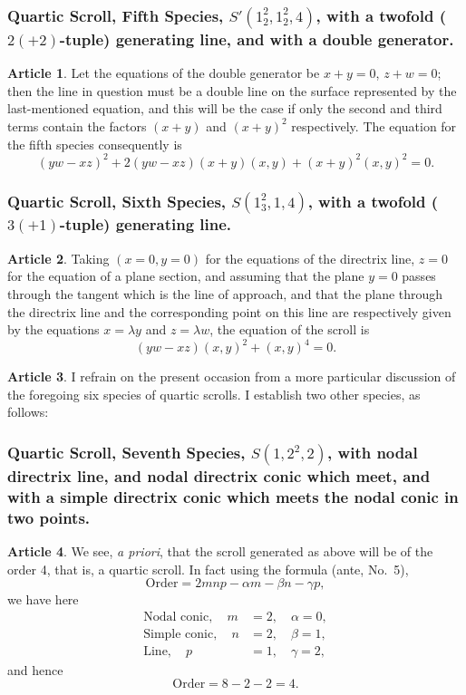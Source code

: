 \documentclass[12pt,a4paper]{article}
\theoremstyle{definition}
\newtheorem{art}{Article}[section]
\begin{document}
\subsubsection*{Quartic Scroll, Fifth Species, $S'(1_2^2, 1_2^2, 4)$, with a twofold ($2 (+ 2)$-tuple) generating line, and with a double generator.}

\begin{art}
Let the equations of the double generator be $x + y = 0$, $z + w = 0$; then the line in question must be a double line on the surface represented by the last-mentioned equation, and this will be the case if only the second and third terms contain the factors $(x + y)$ and $(x + y)^2$ respectively. The equation for the fifth species consequently is
\[
(yw - xz)^2 + 2(yw - xz)(x + y)(x, y) + (x + y)^2 (x, y)^2 = 0.
\]
\end{art}

\subsubsection*{Quartic Scroll, Sixth Species, $S(1_3^2, 1, 4)$, with a twofold ($3 (+ 1)$-tuple) generating line.}

\begin{art}
Taking $(x = 0, y = 0)$ for the equations of the directrix line, $z = 0$ for the equation of a plane section, and assuming that the plane $y = 0$ passes through the tangent which is the line of approach, and that the plane through the directrix line and the corresponding point on this line are respectively given by the equations $x = \lambda y$ and $z = \lambda w$, the equation of the scroll is
\[
(yw - xz)(x, y)^2 + (x, y)^4 = 0.
\]
\end{art}

\begin{art}
I refrain on the present occasion from a more particular discussion of the foregoing six species of quartic scrolls. I establish two other species, as follows:
\end{art}

\subsubsection*{Quartic Scroll, Seventh Species, $S(1, 2^2, 2)$, with nodal directrix line, and nodal directrix conic which meet, and with a simple directrix conic which meets the nodal conic in two points.}

\begin{art}
We see, \textit{a priori}, that the scroll generated as above will be of the order 4, that is, a quartic scroll. In fact using the formula (ante, No.~5),
\[
\text{Order} = 2mnp - \alpha m - \beta n - \gamma p,
\]
we have here
\begin{align*}
\text{Nodal conic}, \quad m &= 2, \quad \alpha = 0, \\
\text{Simple conic}, \quad n &= 2, \quad \beta = 1, \\
\text{Line}, \quad p &= 1, \quad \gamma = 2,
\end{align*}
and hence
\[
\text{Order} = 8 - 2 - 2 = 4.
\]
\end{art}
\end{document}
